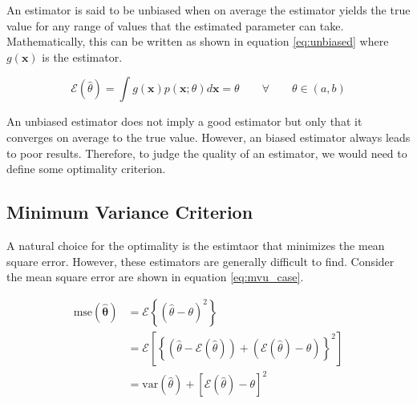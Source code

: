 An estimator is said to be unbiased when on average the estimator yields the true value for any range of values that the estimated parameter can take. Mathematically, this can be written as shown in equation \ref{eq:unbiased} where $g(\mathbf{x})$ is the estimator.

\begin{equation}
    \mathcal{E}(\hat{\theta}) = \int g(\mathbf{x}) p(\mathbf{x}; \theta) d\mathbf{x} = \theta \qquad \forall \qquad \theta \in \left(a, b\right)
    \label{eq:unbiased}
\end{equation}

An unbiased estimator does not imply a good estimator but only that it converges on average to the true value. However, an biased estimator always leads to poor results. Therefore, to judge the quality of an estimator, we would need to define some optimality criterion.

\subsection{Minimum Variance Criterion}

A natural choice for the optimality is the estimtaor that minimizes the mean square error. However, these estimators are generally difficult to find. Consider the mean square error are shown in equation \ref{eq:mvu_case}.

\begin{equation}
    \begin{split}
        \text{mse}(\hat{\mathbf{\theta}}) &= \mathcal{E}\left\{(\hat{\theta} - \theta)^2\right\} \\
        &= \mathcal{E} \left[\left\{(\hat{\theta} - \mathcal{E}(\hat{\theta})) + (\mathcal{E}(\hat{\theta}) - \theta)\right\}^2\right] \\
        &= \text{var}(\hat{\theta}) + \left[\mathcal{E}(\hat{\theta}) - \theta\right]^2
    \end{split}
    \label{eq:mvu_case}
\end{equation}